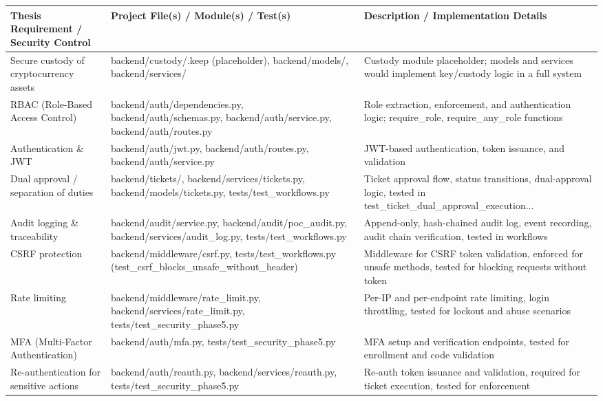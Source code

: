 \documentclass[12pt,a4paper]{report}
\begin{document}
\begin{longtable}{|p{4cm}|p{6cm}|p{5cm}|}
\hline
\textbf{Thesis Requirement / Security Control} & \textbf{Project File(s) / Module(s) / Test(s)} & \textbf{Description / Implementation Details} \\
\hline
Secure custody of cryptocurrency assets & backend/custody/.keep (placeholder), backend/models/, backend/services/ & Custody module placeholder; models and services would implement key/custody logic in a full system \\
\hline
RBAC (Role-Based Access Control) & backend/auth/dependencies.py, backend/auth/schemas.py, backend/auth/service.py, backend/auth/routes.py & Role extraction, enforcement, and authentication logic; require\_role, require\_any\_role functions \\
\hline
Authentication \& JWT & backend/auth/jwt.py, backend/auth/routes.py, backend/auth/service.py & JWT-based authentication, token issuance, and validation \\
\hline
Dual approval / separation of duties & backend/tickets/, backend/services/tickets.py, backend/models/tickets.py, tests/test\_workflows.py & Ticket approval flow, status transitions, dual-approval logic, tested in test\_ticket\_dual\_approval\_execution... \\
\hline
Audit logging \& traceability & backend/audit/service.py, backend/audit/poc\_audit.py, backend/services/audit\_log.py, tests/test\_workflows.py & Append-only, hash-chained audit log, event recording, audit chain verification, tested in workflows \\
\hline
CSRF protection & backend/middleware/csrf.py, tests/test\_workflows.py (test\_csrf\_blocks\_unsafe\_without\_header) & Middleware for CSRF token validation, enforced for unsafe methods, tested for blocking requests without token \\
\hline
Rate limiting & backend/middleware/rate\_limit.py, backend/services/rate\_limit.py, tests/test\_security\_phase5.py & Per-IP and per-endpoint rate limiting, login throttling, tested for lockout and abuse scenarios \\
\hline
MFA (Multi-Factor Authentication) & backend/auth/mfa.py, tests/test\_security\_phase5.py & MFA setup and verification endpoints, tested for enrollment and code validation \\
\hline
Re-authentication for sensitive actions & backend/auth/reauth.py, backend/services/reauth.py, tests/test\_security\_phase5.py & Re-auth token issuance and validation, required for ticket execution, tested for enforcement \\

\end{longtable}
\end{document}
